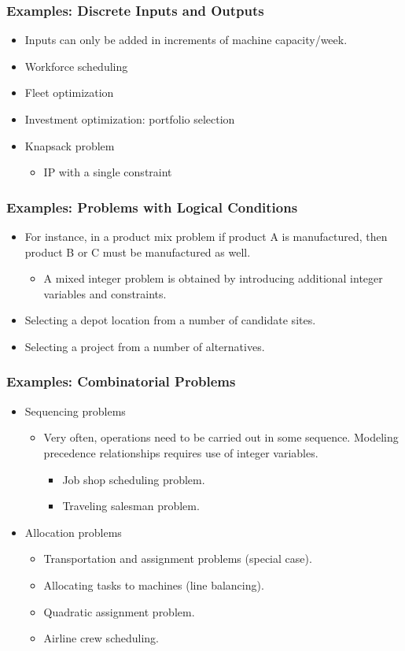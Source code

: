 \documentclass[11pt]{beamer}
\begin{document}
\begin{frame}
\frametitle{Examples: Discrete Inputs and Outputs}
\begin{itemize}
\item Inputs can only be added in increments of machine capacity/week.
\item Workforce scheduling
\item Fleet optimization
\item Investment optimization: portfolio selection
\item Knapsack problem
\begin{itemize}
\item IP with a single constraint
\end{itemize}
\end{itemize}
\end{frame}

\begin{frame}
\frametitle{Examples: Problems with Logical Conditions}
\begin{itemize}
\item For instance, in a product mix problem if product A is manufactured, then product B or C must be manufactured as well.
\begin{itemize}
\item A mixed integer problem is obtained by introducing additional integer variables and constraints.
\end{itemize}
\item Selecting a depot location from a number of candidate sites.
\item Selecting a project from a number of alternatives.
\end{itemize}
\end{frame}


\begin{frame}
\frametitle{Examples: Combinatorial Problems}
\begin{itemize}
\item Sequencing problems
\begin{itemize}
\item Very often, operations need to be carried out in some sequence. Modeling precedence relationships requires use of integer variables.
\begin{itemize}
\item Job shop scheduling problem.
\item Traveling salesman problem.
\end{itemize}
\end{itemize}

\item Allocation problems
\begin{itemize}
\item Transportation and assignment problems (special case).
\item Allocating tasks to machines (line balancing).
\item Quadratic assignment problem.
\item Airline crew scheduling.
\end{itemize}
\end{itemize}
\end{frame}
\end{document}
